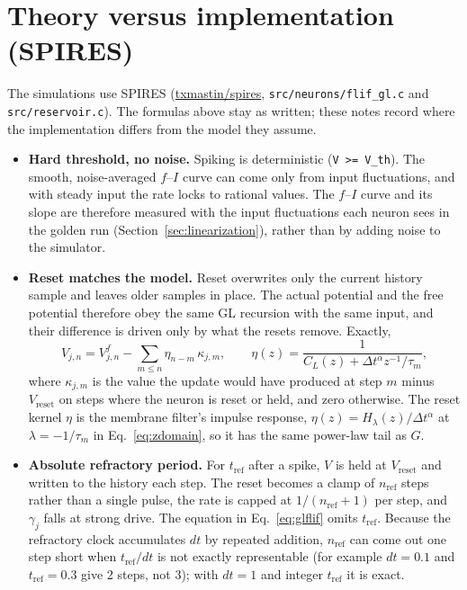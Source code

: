 \documentclass[11pt,a4paper]{article}
\begin{document}
\section{Theory versus implementation (SPIRES)}
\label{sec:spires}

The simulations use SPIRES (\href{https://github.com/txmastin/spires}{txmastin/spires}, \texttt{src/neurons/flif\_gl.c} and \texttt{src/reservoir.c}). The formulas above stay as written; these notes record where the implementation differs from the model they assume.
\begin{itemize}
  \item \textbf{Hard threshold, no noise.} Spiking is deterministic (\texttt{V >= V\_th}). The smooth, noise-averaged $f$--$I$ curve can come only from input fluctuations, and with steady input the rate locks to rational values. The $f$--$I$ curve and its slope are therefore measured with the input fluctuations each neuron sees in the golden run (Section~\ref{sec:linearization}), rather than by adding noise to the simulator.
  \item \textbf{Reset matches the model.} Reset overwrites only the current history sample and leaves older samples in place. The actual potential and the free potential therefore obey the same GL recursion with the same input, and their difference is driven only by what the resets remove. Exactly,
\begin{equation*}
V_{j,n} = V^{f}_{j,n} - \sum_{m \le n} \eta_{n-m}\, \kappa_{j,m}, \qquad \eta(z) = \frac{1}{C_L(z) + \Delta t^{\alpha} z^{-1}/\tau_m},
\end{equation*}
where $\kappa_{j,m}$ is the value the update would have produced at step $m$ minus $V_{\mathrm{reset}}$ on steps where the neuron is reset or held, and zero otherwise. The reset kernel $\eta$ is the membrane filter's impulse response, $\eta(z) = H_{\lambda}(z)/\Delta t^{\alpha}$ at $\lambda = -1/\tau_m$ in Eq.~\eqref{eq:zdomain}, so it has the same power-law tail as $G$.
  \item \textbf{Absolute refractory period.} For $t_{\mathrm{ref}}$ after a spike, $V$ is held at $V_{\mathrm{reset}}$ and written to the history each step. The reset becomes a clamp of $n_{\mathrm{ref}}$ steps rather than a single pulse, the rate is capped at $1/(n_{\mathrm{ref}}+1)$ per step, and $\gamma_j$ falls at strong drive. The equation in Eq.~\eqref{eq:glflif} omits $t_{\mathrm{ref}}$. Because the refractory clock accumulates $dt$ by repeated addition, $n_{\mathrm{ref}}$ can come out one step short when $t_{\mathrm{ref}}/dt$ is not exactly representable (for example $dt = 0.1$ and $t_{\mathrm{ref}} = 0.3$ give 2 steps, not 3); with $dt = 1$ and integer $t_{\mathrm{ref}}$ it is exact.

\end{itemize}
\end{document}
